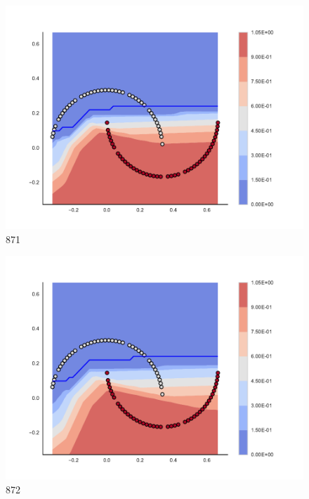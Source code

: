 \begin{subfigure}[b]{0.09\textwidth}
    \includegraphics[clip, trim=2.35cm 1.75cm 4.5cm 0cm,width=\textwidth]{img/convergence/871.pdf}
    \caption{871}
    \label{fig:convergence_871}
\end{subfigure}
%
\begin{subfigure}[b]{0.09\textwidth}
    \includegraphics[clip, trim=2.35cm 1.75cm 4.5cm 0cm,width=\textwidth]{img/convergence/872.pdf}
    \caption{872}
    \label{fig:convergence_872}
\end{subfigure}
%

